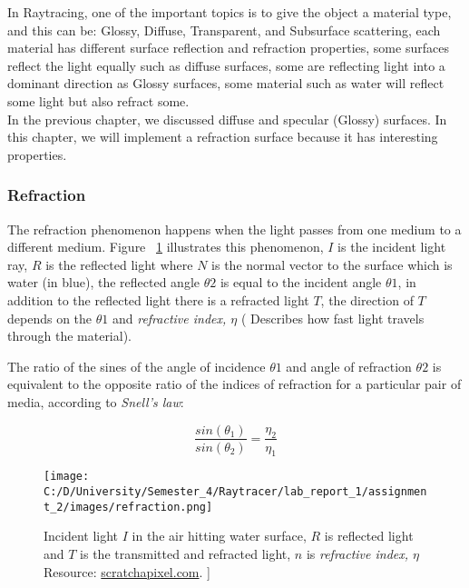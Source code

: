 \documentclass{article}
\begin{document}
	In Raytracing, one of the important topics is to give the object a material type, and this can be: Glossy, Diffuse, Transparent, and Subsurface
	scattering, each material has different surface reflection and refraction properties, some surfaces reflect the light equally such as diffuse surfaces, some are reflecting light into a dominant direction as Glossy surfaces, some material such as water will reflect some light but also refract some.
	\\ 
	In the previous chapter, we discussed diffuse and specular (Glossy) surfaces. In this chapter, we will implement a refraction surface because it has interesting properties. 
	
	\subsubsection{Refraction}
	The refraction phenomenon happens when the light passes from one medium to a different medium.
	Figure ~\ref{fig:refraction} illustrates this phenomenon, $I$ is the incident light ray, $R$ is the reflected light where $N$ is the normal vector to the surface which is water (in blue), the reflected angle  $\theta2$ is equal to the incident angle $\theta1$, in addition to the reflected light there is a refracted light $T$, the direction of $T$ depends on the $\theta1$ and \textit{refractive index, $\eta$} ( Describes how fast light travels through the material).
	
	The ratio of the sines of the angle of incidence  $\theta1$ and angle of refraction $\theta2$ is equivalent to the opposite ratio of the indices of refraction for a particular pair of media, according to \textit{Snell's law}:
	
	
	\begin{equation}
		\frac{sin(\theta_1)}{sin(\theta_2)} = \frac{\eta_2}{\eta_1} 
	\end{equation}
	
	
	\begin{figure}[H]
		\begin{center}
			\texttt{[image: C:/D/University/Semester\_4/Raytracer/lab\_report\_1/assignment\_2/images/refraction.png]}
			
			\caption{Incident light $I$ in the air hitting water surface, $R$ is reflected light and $T$ is the transmitted and refracted light, $n$ is \textit{refractive index, $\eta$  } Resource: \href{https://www.scratchapixel.com/images/upload/shading-intro/shad-refraction6.png?}{scratchapixel.com}.
				]}
			\label{fig:refraction}
		\end{center}
	\end{figure}
	
\end{document}
